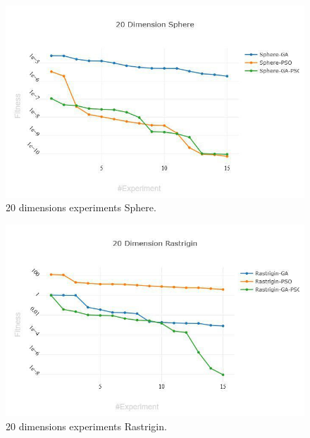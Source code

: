 \documentclass[runningheads]{llncs}
\begin{document}
            \begin{figure}[htp]
              \includegraphics[width=\textwidth]{20-sphere.jpg}
              \caption{20 dimensions experiments Sphere.} \label{fig1}
              \end{figure}
      
              \begin{figure}[htp]
                \includegraphics[width=\textwidth]{20-rastrigin.jpg}
                \caption{20 dimensions experiments Rastrigin.} \label{fig1}
                \end{figure}
      
\end{document}
